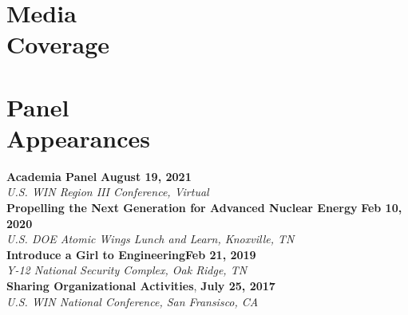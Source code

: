 \documentclass[margin,line]{resume}
\begin{document}
\begin{resume}
    \section{\mysidestyle Media\\Coverage}
    \begin{bibenum}
        \item {}
    \end{bibenum}

    \section{\mysidestyle Panel\\Appearances}
    \textbf{Academia Panel} \hfill \textbf{August 19, 2021}\\
        \textsl{U.S. WIN Region III Conference, Virtual} \\
    \textbf{Propelling the Next Generation for Advanced Nuclear Energy} \hfill \textbf{Feb 10, 2020} \\
        \textsl{U.S. DOE Atomic Wings Lunch and Learn, Knoxville, TN} \\
    \textbf{Introduce a Girl to Engineering}\hfill \textbf{Feb 21, 2019} \\
        \textsl{Y-12 National Security Complex, Oak Ridge, TN} \\
    \textbf{Sharing Organizational Activities}, \hfill \textbf{July 25, 2017} \\
        \textsl{U.S. WIN National Conference, San Fransisco, CA}

\end{resume}
\end{document}
